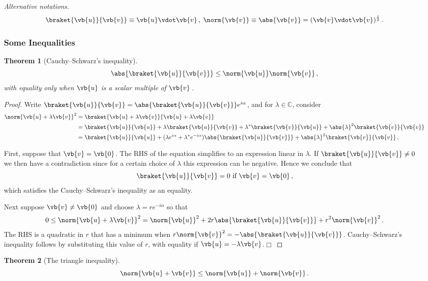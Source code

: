 \documentclass{article}
\theoremstyle{plain}\theoremheaderfont{\normalfont\itshape}\theorembodyfont{\rmfamily}\theoremseparator{.}\newtheorem*{rem}{Remark}\newtheorem*{ex}{Example}\newtheorem*{proof}{Proof}\newtheorem*{altp}{Alternative proof}
\theoremstyle{plain}\theoremheaderfont{\normalfont\bfseries}\theorembodyfont{\rmfamily}\theoremseparator{.}\newtheorem{thm}{Theorem}[section]\newtheorem{lem}[thm]{Lemma}\newtheorem{prop}[thm]{Proposition}\newtheorem*{cor}{Corollary}\newtheorem{defn}[thm]{Definition}\newtheorem{clm}[thm]{Claim}\newtheorem{clminproof}{Claim}
\theoremstyle{break}\theoremheaderfont{\normalfont\itshape}\theorembodyfont{\rmfamily}\theoremseparator{.\medskip}\newtheorem*{proofskip}{Proof}\newtheorem*{exs}{Examples}\newtheorem*{rems}{Remarks}
\theoremstyle{break}\theoremheaderfont{\normalfont\bfseries}\theorembodyfont{\rmfamily}\theoremseparator{.\medskip}\newtheorem{lemskip}[thm]{Lemma}\newtheorem{defnskip}[thm]{Definition}\newtheorem{propskip}[thm]{Proposition}\newtheorem{thmskip}[thm]{Theorem}
\numberwithin{equation}{section}
\newcommand{\qed}{\hfill\ensuremath{\Box}}
\begin{document}
	\textit{Alternative notations.}
	\[\braket{\vb{u}}{\vb{v}}\equiv\vb{u}\vdot\vb{v}\,,\;\norm{\vb{v}}\equiv\abs{\vb{v}}=(\vb{v}\vdot\vb{v})^{\frac{1}{2}}\,.\]
	\subsubsection{Some Inequalities}
	\begin{thm}[Cauchy--Schwarz's inequality]
		\[\abs{\braket{\vb{u}}{\vb{v}}}\le\norm{\vb{u}}\norm{\vb{v}}\,,\]
		with equality only when \(\vb{u}\) is a scalar multiple of \(\vb{v}\)\,.
	\end{thm}

	\begin{proof} Write \(\braket{\vb{u}}{\vb{v}}=\abs{\braket{\vb{u}}{\vb{v}}}e^{i\alpha}\), and for \(\lambda\in\mathbb{C}\), consider
		\begin{align*}
			\norm{\vb{u}+\lambda\vb{v}}^2&=\braket{\vb{u}+\lambda\vb{v}}{\vb{u}+\lambda\vb{v}}\\
			&=\braket{\vb{u}}{\vb{u}}+\lambda\braket{\vb{u}}{\vb{v}}+\lambda^*\braket{\vb{v}}{\vb{u}}+\abs{\lambda}^2\braket{\vb{v}}{\vb{v}}\\
			&=\braket{\vb{u}}{\vb{u}}+(\lambda e^{i\alpha}+\lambda^* e^{-i\alpha})\abs{\braket{\vb{u}}{\vb{v}}}+\abs{\lambda}^2\braket{\vb{v}}{\vb{v}}\,.
		\end{align*}
		
		First, suppose that \(\vb{v}=\vb{0}\). The RHS of the equation simplifies to an expression linear in \(\lambda\). If \(\braket{\vb{u}}{\vb{v}}\ne 0\) we then have a contradiction since for a certain choice of \(\lambda\) this expression can be negative. Hence we conclude that
		\[\braket{\vb{u}}{\vb{v}}=0 \text{ if }\vb{v}=\vb{0}\,,\]
		which satisfies the Cauchy--Schwarz's inequality as an equality.
		
		Next suppose \(\vb{v}\ne\vb{0}\) and choose \(\lambda=re^{-i\alpha}\) so that
		\[0\le\norm{\vb{u}+\lambda\vb{v}}^2=\norm{\vb{u}}^2+2r\abs{\braket{\vb{u}}{\vb{v}}}+r^2\norm{\vb{v}}^2\,.\]
		The RHS is a quadratic in \(r\) that has a minimum when \(r\norm{\vb{v}}^2=-\abs{\braket{\vb{u}}{\vb{v}}}\). Cauchy--Schwarz's inequality follows by substituting this value of \(r\), with equality if \(\vb{u}=-\lambda\vb{v}\).\qed
	\end{proof}

	\begin{thm}[The triangle inequality]
		\[\norm{\vb{u}+\vb{v}}\le\norm{\vb{u}}+\norm{\vb{v}}\,.\]
	\end{thm}
\end{document}
